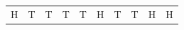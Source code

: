 {{\begin{center}
\begin{tabular}[t]{|l|l|l|l|l|l|l|l|l|l|}
    
        H &
    
    
        T &
    
    
        T &
    
    
        T &
    
    
        T &
    
    
        H &
    
    
        T &
    
    
        T &
    
    
        H &
    
    
        H%
     \tabularnewline\cline{1-1}\cline{2-2}\cline{3-3}\cline{4-4}\cline{5-5}\cline{6-6}\cline{7-7}\cline{8-8}\cline{9-9}\cline{10-10}
    

\end{tabular}
\end{center}}}
